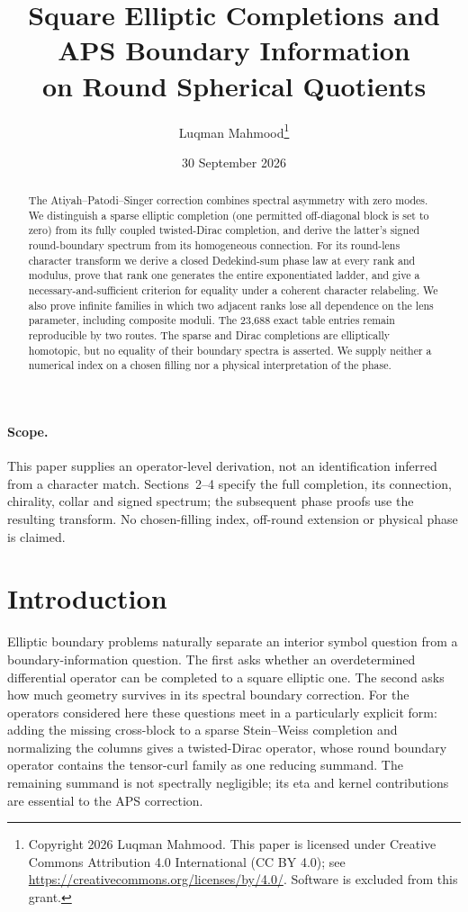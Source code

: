 \documentclass[11pt]{article}
\title{Square Elliptic Completions and APS Boundary Information\\
on Round Spherical Quotients}
\author{Luqman Mahmood\thanks{Copyright 2026 Luqman Mahmood. This paper is licensed under Creative Commons Attribution 4.0 International (CC BY 4.0); see \url{https://creativecommons.org/licenses/by/4.0/}. Software is excluded from this grant.}}
\date{30 September 2026}
\theoremstyle{definition}
\begin{document}
\maketitle

\begin{abstract}
The Atiyah--Patodi--Singer correction combines spectral asymmetry with zero
modes. We distinguish a sparse elliptic completion (one permitted off-diagonal
block is set to zero) from its fully coupled
twisted-Dirac completion, and derive the latter's signed round-boundary
spectrum from its homogeneous connection. For its round-lens character
transform we derive a closed Dedekind-sum phase law at
every rank and modulus, prove that rank one generates the entire
exponentiated ladder, and give a necessary-and-sufficient criterion for
equality under a coherent character relabeling.  We also prove infinite
families in which two adjacent ranks lose all dependence on the lens
parameter, including composite moduli.  The 23,688 exact table
entries remain reproducible by two routes. The sparse and Dirac completions
are elliptically homotopic, but no equality of their boundary spectra is
asserted. We supply neither a numerical index on a chosen filling nor a
physical interpretation of the phase.
\end{abstract}

\paragraph{Scope.}
This paper supplies an operator-level derivation, not an identification
inferred from a character match. Sections~2--4 specify the full completion,
its connection, chirality, collar and signed spectrum; the subsequent phase
proofs use the resulting transform. No
chosen-filling index, off-round extension or physical phase is claimed.

\section{Introduction}

Elliptic boundary problems naturally separate an interior symbol question
from a boundary-information question.  The first asks whether an
overdetermined differential operator can be completed to a square elliptic
one.  The second asks how much geometry survives in its spectral boundary
correction.  For the operators considered here these questions meet in a
particularly explicit form: adding the missing cross-block to a sparse
Stein--Weiss completion and normalizing the columns gives a twisted-Dirac
operator, whose round boundary operator contains the
tensor-curl family as one reducing summand.  The remaining summand is not
spectrally negligible; its eta and kernel contributions are essential to the
APS correction.
\end{document}
